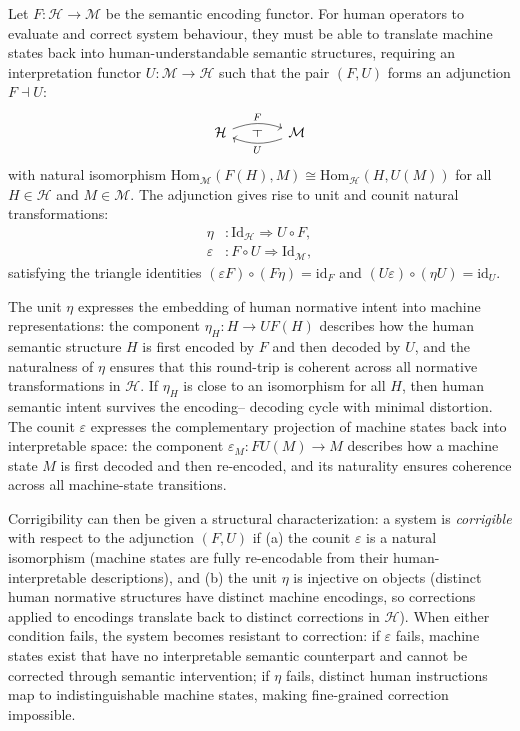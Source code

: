 \documentclass[12pt]{article}
\theoremstyle{definition}
\begin{document}
Let $F : \mathcal{H} \to \mathcal{M}$ be the semantic encoding functor. For
human operators to evaluate and correct system behaviour, they must be able to
translate machine states back into human-understandable semantic structures,
requiring an interpretation functor $U : \mathcal{M} \to \mathcal{H}$ such
that the pair $(F, U)$ forms an adjunction $F \dashv U$:
\begin{equation}
\begin{tikzcd}[column sep=large, row sep=large]
\mathcal{H}
  \arrow[r, bend left=20, "F", ""{name=F,below}]
& \mathcal{M}
  \arrow[l, bend left=20, "U", ""{name=U,above}]
\arrow[phantom, from=F, to=U, "\dashv" rotate=90]
\end{tikzcd}
\end{equation}
with natural isomorphism $\mathrm{Hom}_{\mathcal{M}}(F(H), M) \cong
\mathrm{Hom}_{\mathcal{H}}(H, U(M))$ for all $H \in \mathcal{H}$ and $M \in
\mathcal{M}$. The adjunction gives rise to unit and counit natural
transformations:
\begin{align}
  \eta &: \mathrm{Id}_{\mathcal{H}} \Rightarrow U \circ F, \\
  \varepsilon &: F \circ U \Rightarrow \mathrm{Id}_{\mathcal{M}},
\end{align}
satisfying the triangle identities $(\varepsilon F) \circ (F \eta) =
\mathrm{id}_F$ and $(U \varepsilon) \circ (\eta U) = \mathrm{id}_U$.

The unit $\eta$ expresses the embedding of human normative intent into machine
representations: the component $\eta_H : H \to UF(H)$ describes how the human
semantic structure $H$ is first encoded by $F$ and then decoded by $U$, and the
naturalness of $\eta$ ensures that this round-trip is coherent across all
normative transformations in $\mathcal{H}$. If $\eta_H$ is close to an
isomorphism for all $H$, then human semantic intent survives the encoding--
decoding cycle with minimal distortion. The counit $\varepsilon$ expresses the
complementary projection of machine states back into interpretable space: the
component $\varepsilon_M : FU(M) \to M$ describes how a machine state $M$ is
first decoded and then re-encoded, and its naturality ensures coherence across
all machine-state transitions.

Corrigibility can then be given a structural characterization: a system is
\emph{corrigible} with respect to the adjunction $(F, U)$ if (a) the counit
$\varepsilon$ is a natural isomorphism (machine states are fully re-encodable
from their human-interpretable descriptions), and (b) the unit $\eta$ is
injective on objects (distinct human normative structures have distinct machine
encodings, so corrections applied to encodings translate back to distinct
corrections in $\mathcal{H}$). When either condition fails, the system becomes
resistant to correction: if $\varepsilon$ fails, machine states exist that have
no interpretable semantic counterpart and cannot be corrected through semantic
intervention; if $\eta$ fails, distinct human instructions map to
indistinguishable machine states, making fine-grained correction impossible.
\end{document}
